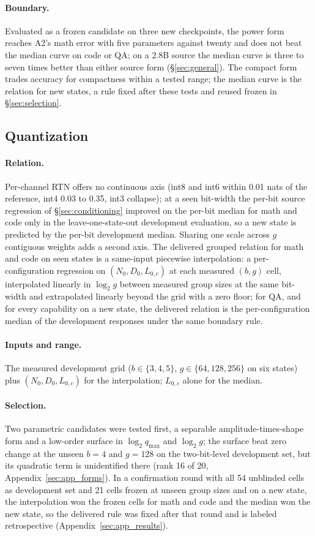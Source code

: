 \paragraph{Boundary.} Evaluated as a frozen candidate on three new checkpoints, the power form reaches A2's math error with five parameters against twenty and does not beat the median curve on code or QA; on a 2.8B source the median curve is three to seven times better than either source form (\S\ref{sec:general}). The compact form trades accuracy for compactness within a tested range; the median curve is the relation for new states, a rule fixed after these tests and reused frozen in \S\ref{sec:selection}.

\subsection{Quantization}
\label{sec:law_quant}

\paragraph{Relation.} Per-channel RTN offers no continuous axis (int8
and int6 within 0.01 nats of the reference, int4 0.03 to 0.35, int3
collapse); at a seen bit-width the per-bit source regression of \S\ref{sec:conditioning} improved on the per-bit median for math and code only in the leave-one-state-out development evaluation, so a new state is predicted by the per-bit development median. Sharing one scale
across $g$ contiguous weights adds a second axis. The delivered grouped
relation for math and code on seen states is a same-input piecewise
interpolation: a per-configuration regression on
$(N_0,D_0,L_{0,c})$ at each measured $(b,g)$ cell, interpolated
linearly in $\log_2 g$ between measured group sizes at the same
bit-width and extrapolated linearly beyond the grid with a zero floor;
for QA, and for every capability on a new state, the delivered
relation is the per-configuration median of the development responses
under the same boundary rule.
\paragraph{Inputs and range.} The measured development grid
($b\in\{3,4,5\}$, $g\in\{64,128,256\}$ on six states) plus
$(N_0,D_0,L_{0,c})$ for the interpolation; $L_{0,c}$ alone for the
median.
\paragraph{Selection.} Two parametric candidates were tested first, a
separable amplitude-times-shape form and a low-order surface in
$\log_2 q_{\max}$ and $\log_2 g$; the surface beat zero change at the
unseen $b=4$ and $g=128$ on the two-bit-level development set, but its
quadratic term is unidentified there (rank 16 of 20,
Appendix~\ref{sec:app_forms}). In a confirmation round with all 54
unblinded cells as development set and 21 cells frozen at unseen
group sizes and on a new state, the interpolation won the frozen cells
for math and code and the median won the new state, so the delivered
rule was fixed after that round and is labeled retrospective
(Appendix~\ref{sec:app_results}).
